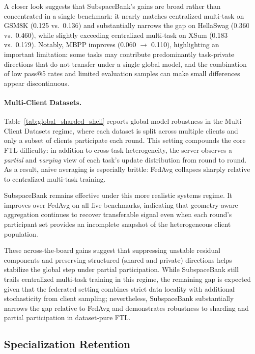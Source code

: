 \documentclass{article}
\theoremstyle{plain}
\theoremstyle{definition}
\theoremstyle{remark}
\begin{document}
A closer look suggests that SubspaceBank’s gains are broad rather than concentrated in a single benchmark: it nearly matches centralized multi-task on GSM8K (0.125 vs.\ 0.136) and substantially narrows the gap on HellaSwag (0.360 vs.\ 0.460), while slightly exceeding centralized multi-task on XSum (0.183 vs.\ 0.179). Notably, MBPP improves (0.060 $\rightarrow$ 0.110), highlighting an important limitation: some tasks may contribute predominantly task-private directions that do not transfer under a single global model, and the combination of low pass@5 rates and limited evaluation samples can make small differences appear discontinuous. 

\paragraph{Multi-Client Datasets.}
Table~\ref{tab:global_sharded_shell} reports global-model robustness in the Multi-Client Datasets regime, where each dataset is split across multiple clients and only a subset of clients participate each round. This setting compounds the core FTL difficulty: in addition to cross-task heterogeneity, the server observes a \emph{partial} and \emph{varying} view of each task’s update distribution from round to round. As a result, naive averaging is especially brittle: FedAvg collapses sharply relative to centralized multi-task training.

SubspaceBank remains effective under this more realistic systems regime. It improves over FedAvg on all five benchmarks, indicating that geometry-aware aggregation continues to recover transferable signal even when each round’s participant set provides an incomplete snapshot of the heterogeneous client population.

These across-the-board gains suggest that suppressing unstable residual components and preserving structured (shared and private) directions helps stabilize the global step under partial participation. While SubspaceBank still trails centralized multi-task training in this regime, the remaining gap is expected given that the federated setting combines strict data locality with additional stochasticity from client sampling; nevertheless, SubspaceBank substantially narrows the gap relative to FedAvg and demonstrates robustness to sharding and partial participation in dataset-pure FTL.



\subsection{Specialization Retention}
\label{sec:exp-specialization}
\end{document}
